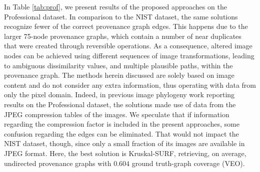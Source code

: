 In Table \ref{tab:prof}, we present results of the proposed approaches on the Professional dataset.
In comparison to the NIST dataset, the same solutions recognize fewer of the correct provenance graph edges.
This happens due to the larger 75-node provenance graphs, which contain a number of near duplicates that were created through reversible operations.
As a consequence, altered image nodes can be achieved using different sequences of image transformations, leading to ambiguous dissimilarity values, and multiple plausible paths, within the provenance graph.
The methods herein discussed are solely based on image content and do not consider any extra information, thus operating with data from only the pixel domain.
Indeed, in previous image phylogeny work reporting results on the Professional dataset, the solutions made use of data from the JPEG compression tables of the images.
We speculate that if information regarding the compression factor is included in the present approaches, some confusion regarding the edges can be eliminated.
That would not impact the NIST dataset, though, since only a small fraction of its images are available in JPEG format.
Here, the best solution is Kruskal-SURF, retrieving, on average, undirected provenance graphs with $0.604$  ground truth-graph coverage (VEO).


